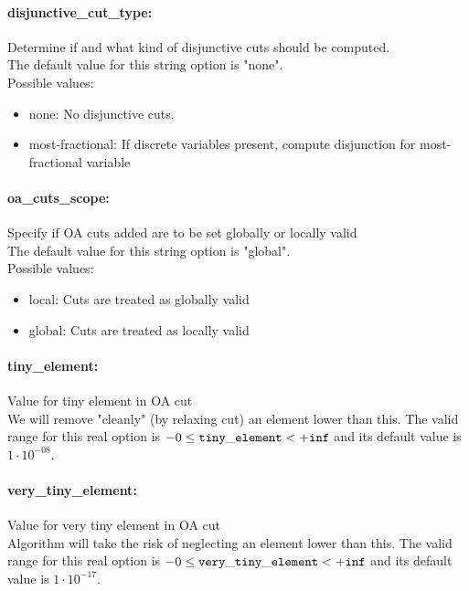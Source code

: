 \paragraph{disjunctive\_cut\_type:}\label{sec:disjunctive_cut_type} Determine if and what kind of disjunctive cuts should be computed. $\;$ \\
The default value for this string option is "none".
\\ 
Possible values:
\begin{itemize}
   \item none: No disjunctive cuts.
   \item most-fractional: If discrete variables present, compute
disjunction for most-fractional variable
\end{itemize}

\paragraph{oa\_cuts\_scope:}\label{sec:oa_cuts_scope} Specify if OA cuts added are to be set globally or locally valid $\;$ \\
The default value for this string option is "global".
\\ 
Possible values:
\begin{itemize}
   \item local: Cuts are treated as globally valid
   \item global: Cuts are treated as locally valid
\end{itemize}

\paragraph{tiny\_element:}\label{sec:tiny_element} Value for tiny element in OA cut $\;$ \\
 We will remove "cleanly" (by relaxing cut) an
element lower than this. The valid range for this real option is 
$-0 \le {\tt tiny\_element } <  {\tt +inf}$
and its default value is $1 \cdot 10^{-08}$.


\paragraph{very\_tiny\_element:}\label{sec:very_tiny_element} Value for very tiny element in OA cut $\;$ \\
 Algorithm will take the risk of neglecting an
element lower than this. The valid range for this real option is 
$-0 \le {\tt very\_tiny\_element } <  {\tt +inf}$
and its default value is $1 \cdot 10^{-17}$.




